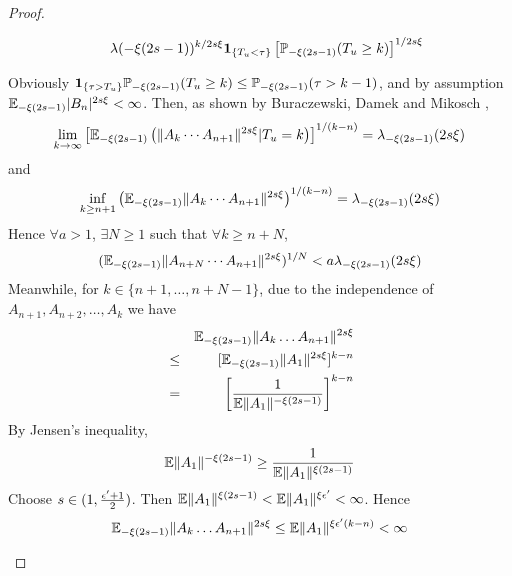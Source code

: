 \documentclass{article}
\begin{document}
\begin{proof}
\begin{enumerate}
\begin{enumerate}
\begin{enumerate}
\begin{eqnarray*}
          && \lambda(-\xi(2s - 1))^{k/2s\xi} \mathbf{1}_{\{T_u < \tau\}}
          \left[ \mathbb{P}_{-\xi(2s - 1)}(T_u \geq k) \right]^{1/2s\xi}
        \end{eqnarray*}
      \end{enumerate}
      Obviously $\mathbf{1}_{\{\tau > T_u\}} \mathbb{P}_{-\xi(2s - 1)}(T_u \geq k) \leq
      \mathbb{P}_{-\xi(2s - 1)}(\tau > k-1)$, and by assumption $\mathbb{E}_{-\xi(2s - 1)}
      |B_n|^{2s\xi} < \infty$. Then, as shown by Buraczewski, Damek
      and Mikosch \cite{BuraczewskiDamekMikosch2015},
      \[
      \lim_{k \to \infty}
      \left[ \mathbb{E}_{-\xi(2s - 1)}\left(
          \|A_k \cdots A_{n+1}\|^{2s\xi}|T_u = k
        \right) \right]^{1/(k-n)} = \lambda_{-\xi(2s - 1)}(2s\xi)
      \]
      and
      \[
      \inf_{k \geq n+1}
      \left(
        \mathbb{E}_{-\xi(2s - 1)}\|A_k \cdots A_{n+1}\|^{2s\xi}
      \right)^{1/(k - n)} = \lambda_{-\xi(2s - 1)}(2s\xi)
      \]
      Hence $\forall a > 1$, $\exists N \geq 1$ such that $\forall k
      \geq n + N$,
      \[
      (\mathbb{E}_{-\xi(2s - 1)}\|A_{n+N} \cdots A_{n+1}\|^{2s\xi})^{1/N} <
      a \lambda_{-\xi(2s - 1)}(2s\xi)
      \]
      Meanwhile, for $k \in \{n+1, \dots, n+N-1\}$, due to the
      independence of $A_{n+1}, A_{n+2}, \dots, A_k$ we have
      \begin{eqnarray*}
        && \mathbb{E}_{-\xi(2s - 1)} \|A_k \dots A_{n+1}\|^{2s\xi} \\
        &\leq& [\mathbb{E}_{-\xi(2s - 1)} \|A_1\|^{2s\xi}]^{k-n} \\
        &=& \left[{1 \over \mathbb{E} \|A_1\|^{-\xi(2s - 1)}}\right]^{k-n} \\
      \end{eqnarray*}
      By Jensen's inequality,
      \[
      \mathbb{E} \|A_1\|^{-\xi(2s - 1)} \geq {1 \over  \mathbb{E} \|A_1\|^{\xi(2s - 1)}}
      \]
      Choose $s \in (1, {\epsilon' + 1 \over 2})$. Then
      $\mathbb{E}\|A_1\|^{\xi(2s - 1)} < \mathbb{E}\|A_1\|^{\xi\epsilon'} < \infty$.
      Hence
      \[
      \mathbb{E}_{-\xi(2s - 1)} \|A_k \dots A_{n+1}\|^{2s\xi} \leq
      \mathbb{E} \|A_1\|^{\xi \epsilon' (k-n)} < \infty      
      \]


\end{enumerate}
\end{enumerate}
\end{proof}
\end{document}
